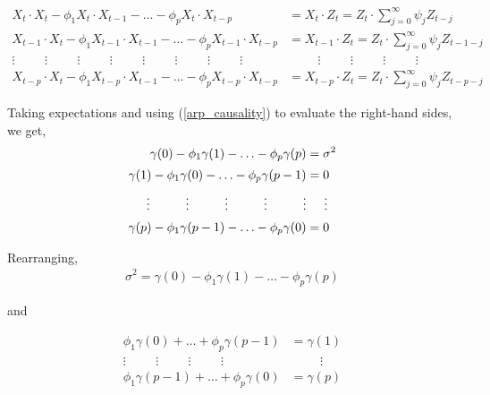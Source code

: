 \documentclass[11pt, a4paper]{article}
\numberwithin{equation}{section}
\theoremstyle{definition}
\begin{document}
\begin{align*}
X_t \cdot X_t - \phi_1 X_t \cdot X_{t-1} - \ldots - \phi_p X_t \cdot X_{t-p} &= X_t \cdot Z_t = Z_t \cdot \sum \limits_{j = 0}^{\infty} \psi_j Z_{t-j} \\[0.2em]
X_{t-1} \cdot X_t - \phi_1 X_{t-1} \cdot X_{t-1} - \ldots - \phi_p X_{t-1} \cdot X_{t-p} &= X_{t-1} \cdot Z_t = Z_t \cdot \sum \limits_{j = 0}^{\infty} \psi_j Z_{t-1-j} \\[0.2em]
\vdots \hspace{1cm} \vdots \hspace{1cm} \vdots \hspace{1cm} \vdots \hspace{1cm} \vdots \hspace{1cm} \vdots \hspace{1cm} \vdots \hspace{1cm} \vdots & \hspace{1cm} \vdots  \hspace{1cm} \vdots \hspace{1cm} \vdots \hspace{1cm} \vdots \\[0.2em]
X_{t-p} \cdot X_t - \phi_1 X_{t-p} \cdot X_{t-1} - \ldots - \phi_p X_{t-p} \cdot X_{t-p} &= X_{t-p} \cdot Z_t = Z_t \cdot \sum \limits_{j = 0}^{\infty} \psi_j Z_{t-p-j}
\end{align*}

Taking expectations and using (\ref{arp_causality}) to evaluate the right-hand sides,  we get,
\begin{align*}
\gamma(0) - \phi_1 \gamma(1) - \ldots - \phi_p \gamma(p) &= \sigma^2 \\[0.2em]
\gamma(1) - \phi_1 \gamma(0) - \ldots - \phi_p \gamma(p-1) &= 0 \\[0.2em]
\vdots \hspace{1cm} \vdots \hspace{1cm} \vdots \hspace{1cm} \vdots \hspace{1cm} \vdots & \hspace{0.5cm} \vdots \\[0.2em]
\gamma(p) - \phi_1 \gamma(p-1) - \ldots - \phi_p \gamma(0) &= 0
\end{align*}

Rearranging,
\begin{align*}
\sigma^2 = \gamma(0) - \phi_1 \gamma(1) - \ldots - \phi_p \gamma(p)
\end{align*}
\begin{center}and\end{center}
\begin{align*}
\phi_1 \gamma(0) + \ldots + \phi_p \gamma(p-1) &= \gamma(1) \\[0.2em]
\vdots \hspace{1cm} \vdots \hspace{1cm} \vdots \hspace{1cm} \vdots & \hspace{1cm} \vdots \\[0.2em]
\phi_1 \gamma(p-1) + \ldots + \phi_p \gamma(0) &= \gamma(p)
\end{align*}
\end{document}

